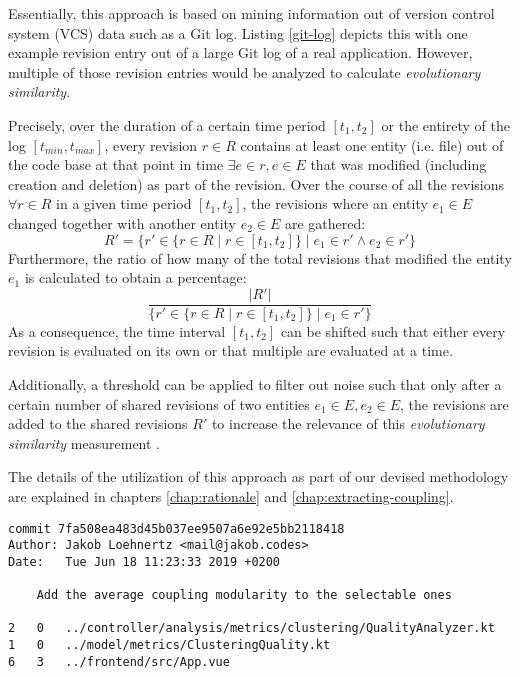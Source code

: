 \documentclass[12pt,a4paper]{report}
\begin{document}
Essentially, this approach is based on mining information out of version
control system (VCS) data such as a Git log. Listing \ref{git-log} depicts
this with one example revision entry out of a large Git log of a real
application. However, multiple of those revision entries would be analyzed to
calculate \textit{evolutionary similarity}.

Precisely, over the duration of a certain time period \([t_1, t_2]\) or the
entirety of the log \([t_{min}, t_{max}]\), every revision \(r \in R\) contains
at least one entity (i.e. file) out of the code base at that point in time
\(\exists e \in r, e \in E\) that was modified (including creation and deletion)
as part of the revision. Over the course of all the revisions \(\forall r \in
R\) in a given time period \([t_1, t_2]\), the revisions where an entity \(e_1
\in E\) changed together with another entity \(e_2 \in E\) are gathered:
\[
  R' = \{ r' \in \{ r \in R \mid r \in [t_1, t_2] \} \mid e_1 \in r' \land e_2 \in r' \}
\]
Furthermore, the ratio of how many of the total revisions that
modified the entity \(e_1\) is calculated to obtain a percentage:
\[
  \frac{\vert R' \vert}{\{ r' \in \{ r \in R \mid r \in [t_1, t_2] \} \mid e_1 \in r' \}}
\]
As a consequence, the time interval \([t_1, t_2]\) can be shifted such
that either every revision is evaluated on its own or that multiple are
evaluated at a time.

Additionally, a threshold can be applied to filter out noise such that only
after a certain number of shared revisions of two entities \(e_1 \in E, e_2 \in
E\), the revisions are added to the shared revisions \(R'\) to increase the
relevance of this \textit{evolutionary similarity} measurement
\cite{tornhill2015crimescene}.

The details of the utilization of this approach as part of our devised
methodology are explained in chapters \ref{chap:rationale} and
\ref{chap:extracting-coupling}.

\begin{lstlisting}[caption=Example Git log, label=git-log, breaklines=true]
commit 7fa508ea483d45b037ee9507a6e92e5bb2118418
Author: Jakob Loehnertz <mail@jakob.codes>
Date:   Tue Jun 18 11:23:33 2019 +0200

    Add the average coupling modularity to the selectable ones

2   0   ../controller/analysis/metrics/clustering/QualityAnalyzer.kt
1   0   ../model/metrics/ClusteringQuality.kt
6   3   ../frontend/src/App.vue
\end{lstlisting}
\end{document}
